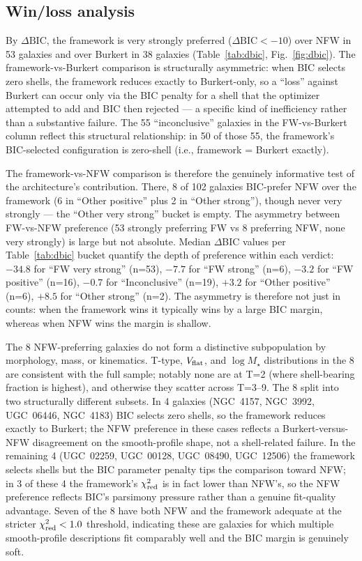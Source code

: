 \subsection{Win/loss analysis}

By $\Delta\mathrm{BIC}$, the framework is very strongly preferred ($\Delta\mathrm{BIC} < -10$) over NFW in 53 galaxies and over Burkert in 38 galaxies (Table~\ref{tab:dbic}, Fig.~\ref{fig:dbic}). The framework-vs-Burkert comparison is structurally asymmetric: when BIC selects zero shells, the framework reduces exactly to Burkert-only, so a ``loss'' against Burkert can occur only via the BIC penalty for a shell that the optimizer attempted to add and BIC then rejected --- a specific kind of inefficiency rather than a substantive failure. The 55 ``inconclusive'' galaxies in the FW-vs-Burkert column reflect this structural relationship: in 50 of those 55, the framework's BIC-selected configuration is zero-shell (i.e., framework = Burkert exactly).

The framework-vs-NFW comparison is therefore the genuinely informative test of the architecture's contribution. There, 8 of 102 galaxies BIC-prefer NFW over the framework (6 in ``Other positive'' plus 2 in ``Other strong''), though never very strongly --- the ``Other very strong'' bucket is empty. The asymmetry between FW-vs-NFW preference (53 strongly preferring FW vs 8 preferring NFW, none very strongly) is large but not absolute. Median $\Delta$BIC values per Table~\ref{tab:dbic} bucket quantify the depth of preference within each verdict: $-34.8$ for ``FW very strong'' (n=53), $-7.7$ for ``FW strong'' (n=6), $-3.2$ for ``FW positive'' (n=16), $-0.7$ for ``Inconclusive'' (n=19), $+3.2$ for ``Other positive'' (n=6), $+8.5$ for ``Other strong'' (n=2). The asymmetry is therefore not just in counts: when the framework wins it typically wins by a large BIC margin, whereas when NFW wins the margin is shallow.

The 8 NFW-preferring galaxies do not form a distinctive subpopulation by morphology, mass, or kinematics. T-type, $V_{\rm flat}$, and $\log M_\star$ distributions in the 8 are consistent with the full sample; notably none are at T=2 (where shell-bearing fraction is highest), and otherwise they scatter across T=3--9. The 8 split into two structurally different subsets. In 4 galaxies (NGC~4157, NGC~3992, UGC~06446, NGC~4183) BIC selects zero shells, so the framework reduces exactly to Burkert; the NFW preference in these cases reflects a Burkert-versus-NFW disagreement on the smooth-profile shape, not a shell-related failure. In the remaining 4 (UGC~02259, UGC~00128, UGC~08490, UGC~12506) the framework selects shells but the BIC parameter penalty tips the comparison toward NFW; in 3 of these 4 the framework's $\chi^2_{\rm red}$ is in fact lower than NFW's, so the NFW preference reflects BIC's parsimony pressure rather than a genuine fit-quality advantage. Seven of the 8 have both NFW and the framework adequate at the stricter $\chi^2_{\rm red} < 1.0$ threshold, indicating these are galaxies for which multiple smooth-profile descriptions fit comparably well and the BIC margin is genuinely soft.

